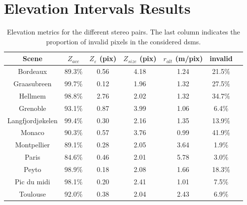 \section{Elevation Intervals Results}\label{sec:results_elevation}
\begin{table}[ht]
    \centering
    \begin{tabular}{|c||c|c|c|c|c|c|}
        \hline
        Scene & $Z_{acc}$ & $Z_\varepsilon$ (pix) & $Z_{size}$ (pix) & $r_{alt}$ (m/pix) & invalid
        \\\hline\hline
        Bordeaux & 89.3$\%$ & 0.56 & 4.18 & 1.24  & 21.5$\%$\\\hline
        Graasubreen & 99.7$\%$ & 0.12 & 1.96 & 1.32  & 27.5$\%$\\\hline
        Hellmem & 98.8$\%$ & 2.76 & 2.02 & 1.32  & 34.7$\%$\\\hline
        Grenoble & 93.1$\%$ & 0.87 & 3.99 & 1.06  & 6.4$\%$\\\hline
        Langfjordjøkelen & 99.4$\%$ & 0.30 & 2.16 & 1.35  & 13.9$\%$\\\hline
        Monaco & 90.3$\%$ & 0.57 & 3.76 & 0.99  & 41.9$\%$\\\hline
        Montpellier & 89.1$\%$ & 0.28 & 2.05 & 3.64  & 1.9$\%$\\\hline
        Paris & 84.6$\%$ & 0.46 & 2.01 & 5.78  & 3.0$\%$\\\hline
        Peyto & 98.9$\%$ & 0.18 & 2.08 & 1.66  & 18.3$\%$\\\hline
        Pic du midi & 98.1$\%$ & 0.20 & 2.41 & 1.01  & 7.5$\%$\\\hline
        Toulouse & 92.0$\%$ & 0.38 & 2.04 & 2.43  & 6.9$\%$\\\hline
    \end{tabular}
    \caption{Elevation metrics for the different stereo pairs. The last column indicates the proportion of invalid pixels in the considered \acrshort{dsm}s.}
    \label{tab:elevation_metrics_global}
\end{table}

